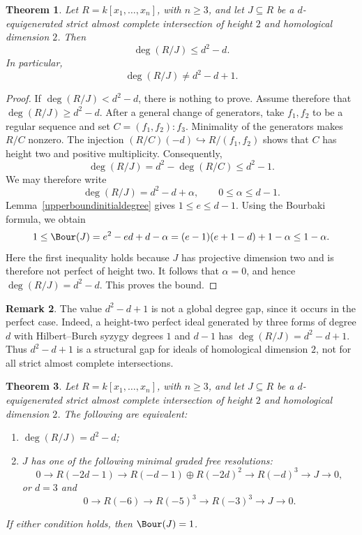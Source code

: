 \documentclass[11pt]{amsart} %
\newtheorem{Theorem}{Theorem}[section]
\theoremstyle{definition}
\newtheorem{Remark}[Theorem]{Remark}
\begin{document}
\begin{Theorem} \label{structural-gap-degree-general}
Let $R=k[x_1,\ldots,x_n]$, with $n\geq 3$, and let
$J\subseteq R$ be a $d$-equigenerated strict almost complete intersection of height $2$ and homological dimension $2$. Then
\[
\deg(R/J)\leq d^2-d.
\]
In particular,
\[
\deg(R/J)\neq d^2-d+1.
\]
\end{Theorem}
\begin{proof}
If $\deg(R/J)<d^2-d$, there is nothing to prove. Assume therefore
that $\deg(R/J)\ge d^2-d$.
After a general change of generators, take $f_1,f_2$ to be a regular
sequence and set $C=(f_1,f_2):f_3$. Minimality of the generators makes
$R/C$ nonzero. The injection
$(R/C)(-d)\hookrightarrow R/(f_1,f_2)$ shows that $C$ has height
two and positive multiplicity. Consequently,
\[
\deg(R/J)=d^2-\deg(R/C)\le d^2-1.
\]
We may therefore write
\[
\deg(R/J)=d^2-d+\alpha,
\qquad 0\le\alpha\le d-1.
\]
Lemma~\ref{upperboundinitialdegree} gives $1\le e\le d-1$.
Using the Bourbaki formula, we obtain
\[
1\le\Bour(J)
=e^2-ed+d-\alpha
=(e-1)(e+1-d)+1-\alpha
\le1-\alpha.
\]
Here the first inequality holds because $J$ has projective dimension
two and is therefore not perfect of height two. It follows that
$\alpha=0$, and hence $\deg(R/J)=d^2-d$. This proves the bound.
\end{proof}

\begin{Remark}
The value $d^2-d+1$ is not a global degree gap, since it occurs in the perfect case. Indeed, a height-two perfect ideal generated by three forms of degree $d$ with Hilbert--Burch syzygy degrees $1$ and $d-1$ has $\deg(R/J)=d^2-d+1$. Thus $d^2-d+1$ is a structural gap for ideals of homological dimension $2$, not for all strict almost complete intersections.
\end{Remark}

\begin{Theorem}\label{structural-gap-degree-general-desc}
Let $R=k[x_1,\ldots,x_n]$, with $n\ge3$, and let $J\subseteq R$ be a $d$-equigenerated strict almost complete intersection of height $2$ and homological dimension $2$. The following are equivalent:
\begin{enumerate}
\item[{\rm(a)}] $\deg(R/J)=d^2-d$;
\item[{\rm(b)}] $J$ has one of the following minimal graded free resolutions:
\[
0\to R(-2d-1)\to R(-d-1)\oplus R(-2d)^2
\to R(-d)^3\to J\to0,
\]
or $d=3$ and
\[
0\to R(-6)\to R(-5)^3\to R(-3)^3\to J\to0.
\]
\end{enumerate}
If either condition holds, then $\Bour(J)=1$.
\end{Theorem}
\end{document}
